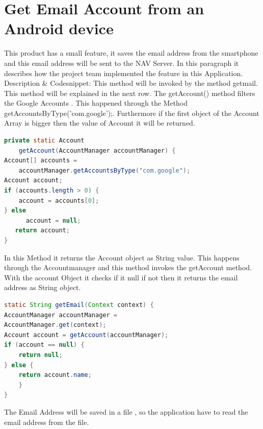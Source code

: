 \section{Get Email Account from an Android device}
This product has  a small feature, it saves the email address from the smartphone and this email address will be sent to the NAV Server. In this paragraph it describes how the project team implemented the feature in this Application.
Description \& Codesnippet:
This method will be invoked by the method getmail. This method will be explained in the next row. The getAccount() method  filters the Google Accounts . This happened through the Method getAccountsByType('com.google');.
Furthermore if the first object of the Account Array is bigger then the value of Account  it will be returned.
\newpage
\begin{lstlisting}[language=java, caption= Accounts,captionpos=b]
private static Account 
	getAccount(AccountManager accountManager) {
Account[] accounts = 
	accountManager.getAccountsByType("com.google");
Account account;
if (accounts.length > 0) {
	account = accounts[0];     
} else
      account = null;
   return account;
}
\end{lstlisting}
In this  Method it returns the Account object as String value. This happens through the Accountmanager and this method invokes the getAccount method. With the account Object it checks if it null if not then it returns the email address as String object.


\begin{lstlisting}[language=java, caption= Email,captionpos=b]
static String getEmail(Context context) {
AccountManager accountManager = 
AccountManager.get(context); 
Account account = getAccount(accountManager);
if (account == null) {
	return null;
} else {
    return account.name;
	}
}
\end{lstlisting}
The Email Address will be saved in a file , so the application  have to read the email address from the file. 